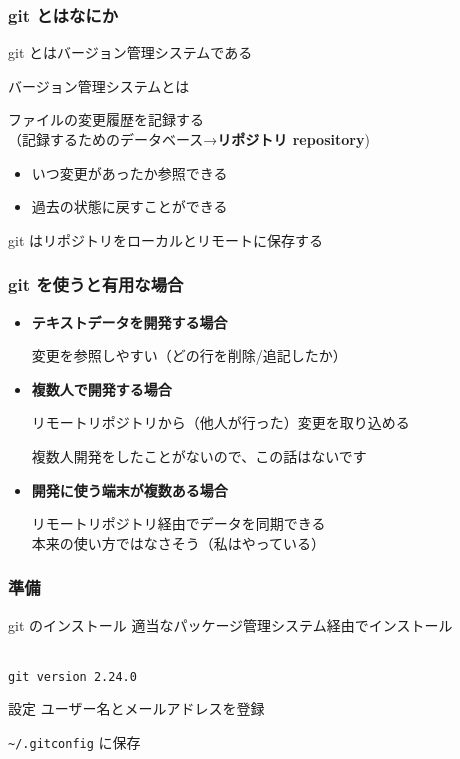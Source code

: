 \begin{frame}
	\frametitle{git とはなにか}

	git とはバージョン管理システムである

	\begin{block}{バージョン管理システムとは}

		ファイルの変更履歴を記録する\\
		（記録するためのデータベース→\textbf{リポジトリ repository})

		\begin{itemize}
			\item いつ変更があったか参照できる
			\item 過去の状態に戻すことができる
		\end{itemize}
	\end{block}

	git はリポジトリをローカルとリモートに保存する
\end{frame}

\begin{frame}
	\frametitle{git を使うと有用な場合}
	\begin{itemize}
		\item \textbf{テキストデータを開発する場合}

			{\small 変更を参照しやすい（どの行を削除/追記したか）}
		\item \textbf{複数人で開発する場合}

			{\small リモートリポジトリから（他人が行った）変更を取り込める}

			{\small 複数人開発をしたことがないので、この話はないです}
		\item \textbf{開発に使う端末が複数ある場合}

			{\small リモートリポジトリ経由でデータを同期できる}\\
			{\small 本来の使い方ではなさそう（私はやっている）}
	\end{itemize}
\end{frame}

\begin{frame}
	\frametitle{準備}
	\begin{block}{git のインストール}
		適当なパッケージ管理システム経由でインストール


		\\
		\texttt{git version 2.24.0}
	\end{block}
	\begin{block}{設定}
		ユーザー名とメールアドレスを登録


		\texttt{\~{}/.gitconfig} に保存
	\end{block}
\end{frame}


